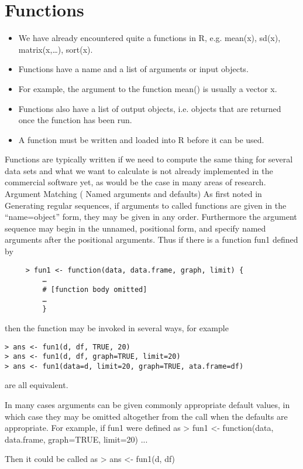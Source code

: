 \section{Functions}

\begin{itemize}
\item	We have already encountered quite a functions in R, e.g. mean(x), sd(x), matrix(x,…), sort(x).
\item	Functions have a name and a list of arguments or input objects. 
\item	For example, the argument to the function mean() is usually a vector x.
\item	Functions also have a list of output objects, i.e. objects that are returned once the function has been run.
\item	A function must be written and loaded into R before it can be used.
\end{itemize}
Functions are typically written if we need to compute the same thing for several data sets and what we want to calculate is not already implemented in the commercial software yet, as would be the case in many areas of research.
Argument Matching ( Named arguments and defaults)
As first noted in Generating regular sequences, if arguments to called functions are given in the “name=object” form, they may be given in any order. Furthermore the argument sequence may begin in the unnamed, positional form, and specify named arguments after the positional arguments. 
Thus if there is a function fun1 defined by 
\begin{verbatim}
     > fun1 <- function(data, data.frame, graph, limit) {
         …
         # [function body omitted]
         …
         }
\end{verbatim}

then the function may be invoked in several ways, for example 
\begin{verbatim}
> ans <- fun1(d, df, TRUE, 20)
> ans <- fun1(d, df, graph=TRUE, limit=20)
> ans <- fun1(data=d, limit=20, graph=TRUE, ata.frame=df)
\end{verbatim}
are all equivalent. 

In many cases arguments can be given commonly appropriate default values, in which case they may be omitted altogether from the call when the defaults are appropriate. For example, if fun1 were defined as 
> fun1 <- function(data, data.frame, graph=TRUE,  limit=20) { ... }

Then it could be called as 
> ans <- fun1(d, df)


